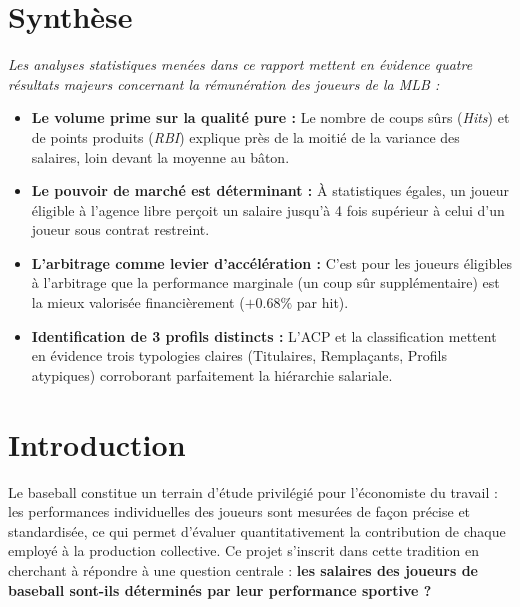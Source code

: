 \documentclass[11pt,a4paper]{article}
\begin{document}
\renewcommand{\abstractname}{Synthèse}
\section*{Synthèse}

\textit{Les analyses statistiques menées dans ce rapport mettent en évidence quatre résultats majeurs concernant la rémunération des joueurs de la MLB :}

\begin{itemize}
    \item \textbf{Le volume prime sur la qualité pure :} Le nombre de coups sûrs (\textit{Hits}) et de points produits (\textit{RBI}) explique près de la moitié de la variance des salaires, loin devant la moyenne au bâton.\vspace{0.3cm}
    \item \textbf{Le pouvoir de marché est déterminant :} À statistiques égales, un joueur éligible à l'agence libre perçoit un salaire jusqu'à 4 fois supérieur à celui d'un joueur sous contrat restreint.\vspace{0.3cm}
    \item \textbf{L'arbitrage comme levier d'accélération :} C'est pour les joueurs éligibles à l'arbitrage que la performance marginale (un coup sûr supplémentaire) est la mieux valorisée financièrement ($+0.68\%$ par hit).\vspace{0.3cm}
    \item \textbf{Identification de 3 profils distincts :} L'ACP et la classification mettent en évidence trois typologies claires (Titulaires, Remplaçants, Profils atypiques) corroborant parfaitement la hiérarchie salariale.
\end{itemize}

\section*{Introduction}

Le baseball constitue un terrain d'étude privilégié pour l'économiste du travail : les
performances individuelles des joueurs sont mesurées de façon précise et standardisée,
ce qui permet d'évaluer quantitativement la contribution de chaque employé à la
production collective. Ce projet s'inscrit dans cette tradition en cherchant à répondre
à une question centrale : \textbf{les salaires des joueurs de baseball sont-ils déterminés
par leur performance sportive ?}\vspace{0.3cm}
\end{document}
